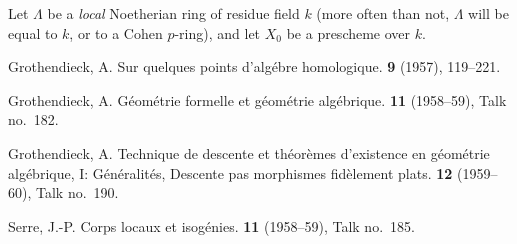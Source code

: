 \documentclass{article}
\theoremstyle{plain}
\theoremstyle{definition}
\begin{document}
Let $\Lambda$ be a \emph{local} Noetherian ring of residue field $k$ (more often than not, $\Lambda$ will be equal to $k$, or to a Cohen $p$-ring), and let $X_0$ be a prescheme over $k$.





\nocite{*}
\begin{thebibliography}{4}

  {\sc Grothendieck, A.}
  \newblock Sur quelques points d'alg\'{e}bre homologique.
   {\bf 9} (1957), 119--221.

  {\sc Grothendieck, A.}
  \newblock G\'{e}om\'{e}trie formelle et g\'{e}om\'{e}trie alg\'{e}brique.
   \textbf{11} (1958--59), Talk no.~182.

  {\sc Grothendieck, A.}
  \newblock Technique de descente et th\'{e}or\`{e}mes d'existence en g\'{e}om\'{e}trie alg\'{e}brique, I: G\'{e}n\'{e}ralit\'{e}s, Descente pas morphismes fid\`{e}lement plats.
   \textbf{12} (1959--60), Talk no.~190.

  {\sc Serre, J.-P.}
  \newblock Corps locaux et isog\'{e}nies.
   \textbf{11} (1958--59), Talk no.~185.

\end{thebibliography}
\end{document}
